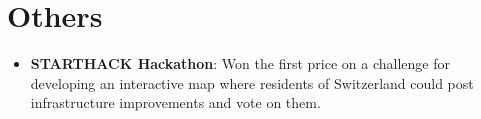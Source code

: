 \documentclass[letterpaper,11pt]{article}
\newcommand{\resumeItem}[2]{
  \item\small{
    \textbf{#1}{: #2}
  }
}
\newcommand{\resumeSubItem}[2]{\resumeItem{#1}{#2}}
\newcommand{\resumeSubHeadingListStart}{\begin{itemize}[leftmargin=*]}
\newcommand{\resumeSubHeadingListEnd}{\end{itemize}}
\begin{document}
\section{Others}
  \resumeSubHeadingListStart
    \resumeSubItem{STARTHACK Hackathon}
      {Won the first price on a challenge for developing an interactive map where residents of Switzerland could post infrastructure improvements and vote on them.}
  \resumeSubHeadingListEnd
\end{document}
